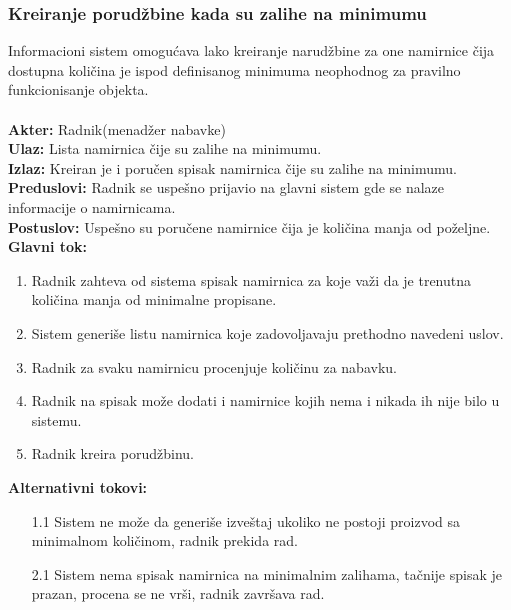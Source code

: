 \documentclass{article}
\begin{document}
\subsubsection{Kreiranje porudžbine kada su zalihe na minimumu}
Informacioni sistem omogućava lako kreiranje narudžbine za one namirnice čija dostupna količina je ispod definisanog minimuma neophodnog za pravilno funkcionisanje objekta.\\\\
\textbf{Akter:} Radnik(menadžer nabavke)\\
\textbf{Ulaz:} Lista namirnica čije su zalihe na minimumu.\\
\textbf{Izlaz:} Kreiran je i poručen spisak namirnica čije su zalihe na minimumu.\\
\textbf{Preduslovi:} Radnik se uspešno prijavio na glavni sistem gde se nalaze informacije o namirnicama.\\
\textbf{Postuslov:} Uspešno su poručene namirnice čija je količina manja od poželjne.\\
\textbf{Glavni tok:} 
\begin{enumerate}
	\item Radnik zahteva od sistema spisak namirnica za koje važi da je trenutna količina manja od minimalne propisane.
	\item Sistem generiše listu namirnica koje zadovoljavaju prethodno navedeni uslov.
	\item Radnik za svaku namirnicu procenjuje količinu za nabavku. 
	\item Radnik na spisak može dodati i namirnice kojih nema i nikada ih nije bilo u sistemu. 
	\item Radnik kreira porudžbinu.
\end{enumerate}
\textbf{Alternativni tokovi:} \\
\begin{itemize}
\item[1.1] Sistem ne može da generiše izveštaj ukoliko ne postoji proizvod sa minimalnom količinom, radnik prekida rad.
\item[2.1] Sistem nema spisak namirnica na minimalnim zalihama, tačnije spisak je prazan, procena se ne vrši, radnik završava rad.
\end{itemize}
\end{document}
